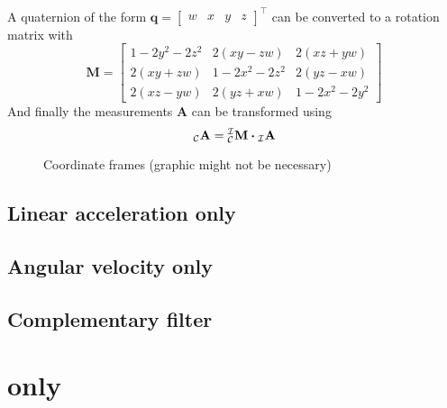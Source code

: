 A quaternion of the form
$\mathbf{q} = \left[\begin{array}{llll} w & x & y & z \end{array}\right]^{\top}$
can be converted to a rotation matrix with
\begin{equation}
    \mathbf{M} =
    \left[
        \begin{array}{ccc}
            1-2 y^{2}-2 z^{2} & 2(x y-z w) & 2(x z+y w) \\
            2(x y+z w) & 1-2 x^{2}-2 z^{2} & 2(y z-x w) \\
            2(x z-y w) & 2(y z+x w) & 1-2 x^{2}-2 y^{2}
        \end{array}
        \right]
    \end{equation}
And finally the measurements $\mathbf{A}$ can be transformed using
\begin{equation}
    \vincs{A}{c} = \mtf{i}{c} \vdot \vincs{A}{i}
\end{equation}

\begin{figure}[htpb]
    \centering
    
	\caption{Coordinate frames (graphic might not be necessary)}
    \label{fig:tikz_car_frames}
\end{figure}

\subsection{Linear acceleration only}


\subsection{Angular velocity only}


\subsection{Complementary filter}



\section{ only}

